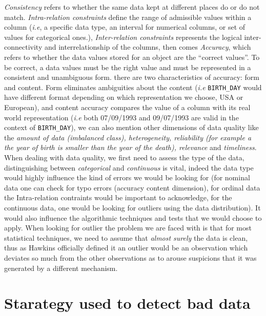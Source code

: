 \documentclass{article}
\begin{document}
\textit{Consistency} refers to whether the same data kept at different places do or do not match. \textit{Intra-relation constraints} define the range of admissible values within a column (\textit{i.e}, a specific data type, an interval for numerical columns, or set of values for categorical ones.), \textit{Inter-relation constraints} represents the logical inter-connectivity and interrelationship of the columns, then comes \textit{Accuracy}, which refers to whether the data values stored for an object are the ``correct values''. To be correct, a data values must be the right value and must be represented in a consistent and unambiguous form. there are two characteristics of accuracy: form and content. Form eliminates ambiguities about the content (\textit{i.e} \texttt{BIRTH\_DAY} would have different format depending on which representation we choose, USA or European), and content accuracy compares the value of a column with its real world representation (\textit{i.e} both 07/09/1993 and 09/07/1993 are valid in the context of \texttt{BIRTH\_DAY}), we can also mention other dimensions of data quality like the \textit{amount of data (imbalanced class), heterogeneity, reliability (for example a the year of birth is smaller than the year of the death), relevance} and \textit{timeliness}. \\
When dealing with data quality, we first need to assess the type of the data, distinguishing between \textit{categorical} and \textit{continuous} is vital, indeed the data type would highly influence the kind of errors we would be looking for (for nominal data one can check for typo errors (accuracy content dimension), for ordinal data the Intra-relation contraints would be important to acknowledge, for the continuous data, one would be looking for outliers using the data distribution). It would also influence the algorithmic techniques and tests that we would choose to apply.
When looking for outlier the problem we are faced with is that for most statistical techniques, we need to assume that \textit{almost surely} the data is clean, thus as Hawkins officially defined it an outlier would be an observation which deviates so much from the other observations as to arouse suspicions that it was generated by a different mechanism.



\section{Starategy used to detect bad data} %
\label{sec:Starategy used to detect bad data}
\end{document}
